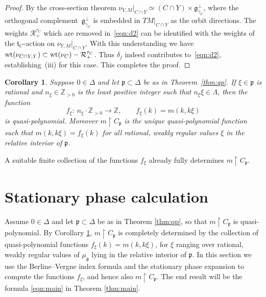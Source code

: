 \documentclass[11pt]{article}
\numberwithin{equation}{section}
\newtheorem{Corollary}[Theorem]{Corollary}
\newcommand{\tn}[1]{\textnormal{#1}}
\def\g{\ensuremath{\mathfrak{g}}}
\def\t{\ensuremath{\mathfrak{t}}}
\def\p{\ensuremath{\mathfrak{p}}}
\def\R{\ensuremath{\mathcal{R}}}
\def\bZ{\ensuremath{\mathbb{Z}}}
\begin{document}
\begin{proof}
By the cross-section theorem $\nu_{Y,M}|_{C\cap Y}\simeq (C\cap Y)\times \g_{\gamma_C}^\perp$, where the orthogonal comple\-ment~$\g_{\gamma_C}^\perp$ is embedded in $TM|_{C\cap Y}$ as the orbit directions. The weights $\R_+^{\tau_C}$ which are removed in~\eqref{eqn:d2} can be identified with the weights of the $\t_C$-action on $\nu_{Y,M}|_{C\cap Y}$. With this understanding we have $\tn{wt}(\nu_{C\cap Y,Y})\subset \tn{wt}(\nu_C)-\R_+^{\tau_C}$. Thus $\delta_j$ indeed contributes to~\eqref{eqn:d2}, establishing~(iii) for this case. This completes the proof.
\end{proof}

\begin{Corollary}\label{cor:asymptoticdetermination}Suppose $0 \in \Delta$ and let $\p \subset \Delta$ be as in Theorem~{\rm \ref{thm:qp}}. If $\xi \in \p$ is rational and $n_\xi \in \bZ_{>0}$ is the least positive integer such that $n_\xi \xi \in \Lambda$, then the function
\[ f_\xi \colon \ n_\xi\cdot \bZ_{>0}\rightarrow \bZ, \qquad f_\xi(k)=m(k,k\xi) \]
is quasi-polynomial. Moreover $m\upharpoonright C_\p$ is the unique quasi-polynomial function such that $m(k,k\xi)\allowbreak =f_\xi(k)$ for all rational, weakly regular values $\xi$ in the relative interior of $\p$.
\end{Corollary}
\begin{Remark}A suitable finite collection of the functions $f_\xi$ already fully determines $m \upharpoonright C_\p$.
\end{Remark}

\section{Stationary phase calculation}\label{sec:statphase}
Assume $0 \in \Delta$ and let $\p \subset \Delta$ be as in Theorem \ref{thm:qp}, so that $m \upharpoonright C_\p$ is quasi-polynomial. By Corollary \ref{cor:asymptoticdetermination}, $m \upharpoonright C_\p$ is completely determined by the collection of quasi-polynomial functions $f_\xi(k)=m(k,k\xi)$, for $\xi$ ranging over rational, weakly regular values of $\mu_\g$ lying in the relative interior of $\p$. In this section we use the Berline--Vergne index formula and the stationary phase expansion to compute the functions $f_\xi$, and hence also $m \upharpoonright C_\p$. The end result will be the formula \eqref{eqn:main} in Theorem \ref{thm:main}.
\end{document}
